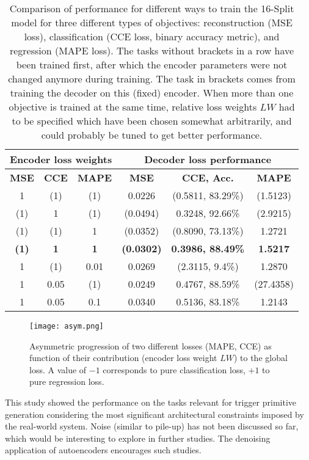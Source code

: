 \documentclass[../../main.tex]{subfiles}
\begin{document}
\begin{table}[htp]
\centering
	\caption{Comparison of performance for different ways to train the 16-Split model for three different types of objectives: reconstruction (MSE loss), classification (CCE loss, binary accuracy metric), and regression (MAPE loss). The tasks without brackets in a row have been trained first, after which the encoder parameters were not changed anymore during training. The task in brackets comes from training the decoder on this (fixed) encoder. When more than one objective is trained at the same time, relative loss weights $LW$ had to be specified which have been chosen somewhat arbitrarily, and could probably be tuned to get better performance.}
\begin{tabular}{ c | c | c || c | c | c}
	\multicolumn{3}{c||}{\textbf{Encoder loss weights}} & \multicolumn{3}{c}{\textbf{Decoder loss performance}}\\
	\hline
	\textbf{MSE} & \textbf{CCE} & \textbf{MAPE} & \textbf{MSE} & \textbf{CCE, Acc.} & \textbf{MAPE}\\
	\hline
	1 & (1) & (1) & 0.0226 & (0.5811, 83.29\%) & (1.5123) \\
	(1) & 1 & (1) & (0.0494) & 0.3248, 92.66\% & (2.9215) \\
	(1) & (1) & 1 & (0.0352) & (0.8090, 73.13\%) & 1.2721 \\
	\hline
	\textbf{(1)} & \textbf{1} & \textbf{1} & \textbf{(0.0302)} & \textbf{0.3986, 88.49\%} & \textbf{1.5217} \\
	1 & (1) & 0.01 & 0.0269 & (2.3115, 9.4\%) & 1.2870 \\
	1 & 0.05 & (1) & 0.0249 & 0.4767, 88.59\% & (27.4358) \\
	\hline
	\hline
	1 & 0.05 & 0.1 & 0.0340 & 0.5136, 83.18\% & 1.2143 \\
\end{tabular}
\label{tab:16sum}
\end{table}
\begin{figure}[htp]
			\begin{center}
				\texttt{[image: asym.png]}
				\caption{Asymmetric progression of two different losses (MAPE, CCE) as function of their contribution (encoder loss weight $LW$) to the global loss. A value of $-1$ corresponds to pure classification loss, $+1$ to pure regression loss.}
				\label{fig:asym}
			\end{center}
\end{figure}
This study showed the performance on the tasks relevant for trigger primitive generation considering the most significant architectural constraints imposed by the real-world system. Noise (similar to pile-up) has not been discussed so far, which would be interesting to explore in further studies. The denoising application of autoencoders encourages such studies.
\end{document}
